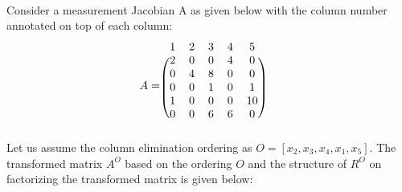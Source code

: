 \paragraph{}
Consider a measurement Jacobian A as given below with the column number annotated on top of each column:
\[ 
A = 
\begin{blockarray}{cccccc}
1 & 2 & 3 & 4 & 5 & \\
\begin{block}{(ccccc)c}
2 & 0 & 0 & 4 & 0 & \\
0 & 4 & 8 & 0 & 0 & \\
0 & 0 & 1 & 0 & 1 & \\
1 & 0 & 0 & 0 & 10 & \\
0 & 0 & 6 & 6 & 0 & \\
\end{block}
\end{blockarray}
\]
Let us assume the column elimination ordering as $O = [x_2, x_3, x_4, x_1, x_5]$. The transformed matrix $A^O$ based on the ordering $O$ and the structure of $R^O$ on factorizing the transformed matrix is given below:
